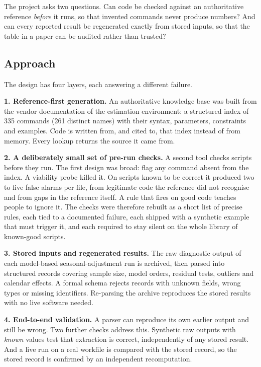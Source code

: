 \documentclass[
  british,
  a4paper,
]{article}
\begin{document}
The project asks two questions. Can code be checked against an
authoritative reference \emph{before} it runs, so that invented commands
never produce numbers? And can every reported result be regenerated
exactly from stored inputs, so that the table in a paper can be audited
rather than trusted?

\subsection{Approach}\label{approach}

The design has four layers, each answering a different failure.

\textbf{1. Reference-first generation.} An authoritative knowledge base
was built from the vendor documentation of the estimation environment: a
structured index of 335 commands (261 distinct names) with their syntax,
parameters, constraints and examples. Code is written from, and cited
to, that index instead of from memory. Every lookup returns the source
it came from.

\textbf{2. A deliberately small set of pre-run checks.} A second tool
checks scripts before they run. The first design was broad: flag any
command absent from the index. A viability probe killed it. On scripts
known to be correct it produced two to five false alarms per file, from
legitimate code the reference did not recognise and from gaps in the
reference itself. A rule that fires on good code teaches people to
ignore it. The checks were therefore rebuilt as a short list of precise
rules, each tied to a documented failure, each shipped with a synthetic
example that must trigger it, and each required to stay silent on the
whole library of known-good scripts.

\textbf{3. Stored inputs and regenerated results.} The raw diagnostic
output of each model-based seasonal-adjustment run is archived, then
parsed into structured records covering sample size, model orders,
residual tests, outliers and calendar effects. A formal schema rejects
records with unknown fields, wrong types or missing identifiers.
Re-parsing the archive reproduces the stored results with no live
software needed.

\textbf{4. End-to-end validation.} A parser can reproduce its own
earlier output and still be wrong. Two further checks address this.
Synthetic raw outputs with \emph{known} values test that extraction is
correct, independently of any stored result. And a live run on a real
workfile is compared with the stored record, so the stored record is
confirmed by an independent recomputation.
\end{document}
